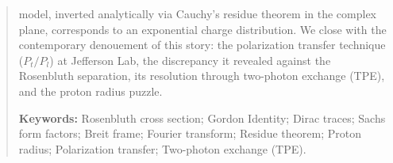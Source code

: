 \documentclass[10pt,a4paper]{article}
\begin{document}
\begin{quote}
model, inverted analytically via Cauchy's residue theorem in the complex plane, corresponds to an exponential charge distribution. We close with the contemporary denouement of this story: the polarization transfer technique ($P_t/P_l$) at Jefferson Lab, the discrepancy it revealed against the Rosenbluth separation, its resolution through two-photon exchange (TPE), and the proton radius puzzle.
\par\vspace{1ex}
\textbf{Keywords:} Rosenbluth cross section; Gordon Identity; Dirac traces; Sachs form factors; Breit frame; Fourier transform; Residue theorem; Proton radius; Polarization transfer; Two-photon exchange (TPE).
\end{quote}

\vspace{0.5em}
\end{document}
